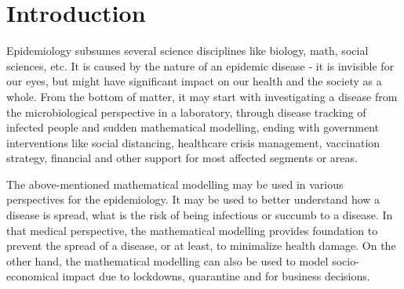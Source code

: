 \documentclass[
  digital, %
  oneside, %
  lof,     %
  lot,     %
]{fithesis4}
\begin{document}

\chapter*{Introduction}

Epidemiology subsumes several science disciplines like biology, 
math, social sciences, etc. 
It is caused by the nature of an epidemic disease - it is 
invisible for our eyes, but might have significant impact on 
our health and the society as a whole.
From the bottom of matter, it may start with investigating a 
disease from the microbiological perspective in a laboratory, 
through disease tracking of infected people and sudden mathematical
modelling, ending  with government interventions like social distancing, 
healthcare crisis management, vaccination strategy, financial and other 
support for most affected segments or areas.

The above-mentioned mathematical modelling may be used in 
various perspectives for the epidemiology. It may be used to
better understand how a disease is spread, what is the risk 
of being infectious or succumb to a disease. In that medical 
perspective, the mathematical modelling provides foundation to 
prevent the spread of a disease, or at least, to minimalize health damage.
On the other hand, the mathematical modelling can also be used to model
socio-economical impact due to lockdowns, quarantine and for business decisions.
\end{document}
